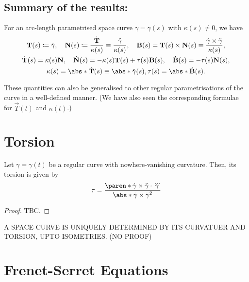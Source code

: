 \documentclass[11pt]{penrose}
\newcommand{\vT}{\vec{T}}
\newcommand{\vN}{\vec{N}}
\newcommand{\vB}{\vec{B}}
\newcommand{\missing}[1]{{\color{red}#1}}
\begin{document}
\subsection*{Summary of the results:}
For an arc-length parametrised space curve $\gamma = \gamma(s)$ with $\kappa(s) \neq 0$, we have
\begin{gather*}
    \vT(s) \coloneq \dot{\gamma},
    \quad
    \vN(s) \coloneq \frac{\dot{\vT}}{\kappa(s)} \equiv \frac{\ddot{\gamma}}{\kappa(s)},
    \quad
    \vB(s) = \vT(s) \times \vN(s) \equiv \frac{\dot{\gamma} \times \ddot{\gamma}}{\kappa(s)},\\
    \dot{\vT}(s) = \kappa(s) \vN,
    \quad
    \dot{\vN}(s) = -\kappa(s) \vT(s) + \tau(s) \vB(s),
    \quad
    \dot{\vB}(s) = - \tau(s) \vN(s),\\
    \kappa(s) = \abs*{\dot{\vT}(s)} \equiv \abs*{\ddot{\gamma}(s)},
    \tau(s) = \abs*{\dot{\vB}(s)}.
\end{gather*}

These quantities can also be generalised to other regular parametrisations of the curve in a well-defined manner. (We have also seen the corresponding formulae for $\vT(t)$ and $\kappa(t)$.)

\section{Torsion}

\begin{nthm}
    Let $\gamma = \gamma(t)$ be a regular curve with nowhere-vanishing curvature. Then, its torsion is given by
    \begin{equation}
        \tau
        = \frac{\paren*{\dot{\gamma} \times \ddot{\gamma}} \cdot \dddot{\gamma}}{\abs*{\dot{\gamma} \times \ddot{\gamma}}^2}
    \end{equation}
\end{nthm}
\begin{proof}
    TBC.
\end{proof}

\missing{\begin{nthm}
    A SPACE CURVE IS UNIQUELY DETERMINED BY ITS CURVATUER AND TORSION, UPTO ISOMETRIES. (NO PROOF)
\end{nthm}}

\section{Frenet-Serret Equations}
\end{document}
